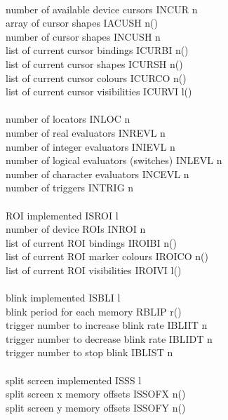 \begin{tabbing}
\\
number of available device cursors  \> INCUR \> n \\
array of cursor shapes  \> IACUSH \> n() \\
number of cursor shapes  \> INCUSH \> n \\
list of current cursor bindings  \> ICURBI \> n() \\
list of current cursor shapes  \> ICURSH \> n() \\
list of current cursor colours  \> ICURCO \> n() \\
list of current cursor visibilities  \> ICURVI \> l() \\
\\
number of locators  \> INLOC \> n \\
number of real evaluators  \> INREVL \> n \\
number of integer evaluators  \> INIEVL \> n \\
number of logical evaluators (switches)  \> INLEVL \> n \\
number of character evaluators  \> INCEVL \> n \\
number of triggers  \> INTRIG \> n \\
\\
ROI implemented  \> ISROI \> l \\
number of device ROIs  \> INROI \> n \\
list of current ROI bindings  \> IROIBI \> n() \\
list of current ROI marker colours  \> IROICO \> n() \\
list of current ROI visibilities  \> IROIVI \> l() \\
\\
blink implemented  \> ISBLI \> l \\
blink period for each memory  \> RBLIP \> r() \\
trigger number to increase blink rate  \> IBLIIT \> n \\
trigger number to decrease blink rate  \> IBLIDT \> n \\
trigger number to stop blink  \> IBLIST \> n \\
\\
split screen implemented  \> ISSS \> l \\
split screen x memory offsets  \> ISSOFX \> n() \\
split screen y memory offsets  \> ISSOFY \> n() \\

\end{tabbing}
